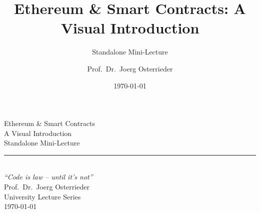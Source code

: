 \documentclass[8pt,aspectratio=169]{beamer}
\title{Ethereum \& Smart Contracts: A Visual Introduction}
\subtitle{Standalone Mini-Lecture}
\author{Prof.~Dr.~Joerg Osterrieder}
\institute{University Lecture Series}
\date{\today}
\begin{document}
\begin{frame}[plain]
\vspace{2cm}
\begin{center}
{\Huge\color{mlpurple} Ethereum \& Smart Contracts}\\[0.4cm]
{\Large\color{mlblue} A Visual Introduction}\\[0.3cm]
{\normalsize Standalone Mini-Lecture}\\[0.3cm]
\textcolor{mlgray}{\rule{6cm}{0.4pt}}\\[0.3cm]
{\small\itshape ``Code is law -- until it's not''}\\[1.5cm]
{\normalsize Prof.~Dr.~Joerg Osterrieder}\\[0.2cm]
{\small University Lecture Series}\\[0.2cm]
{\small \today}
\end{center}
\end{frame}
\end{document}
